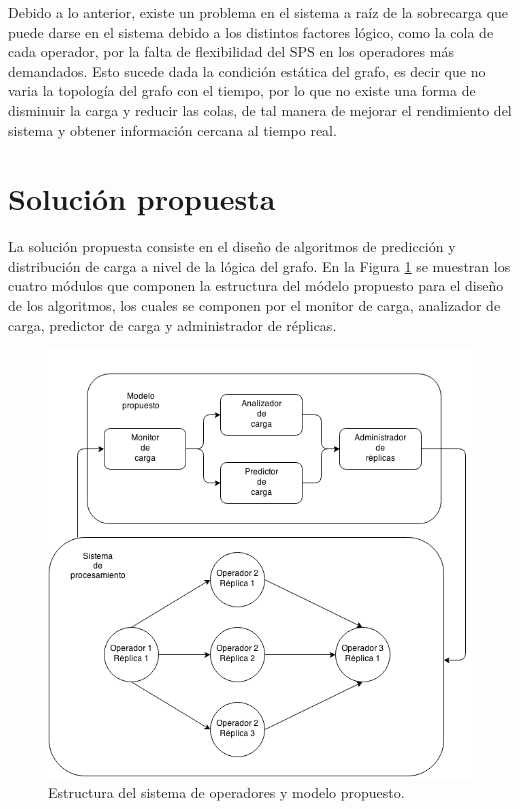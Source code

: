 Debido a lo anterior, existe un problema en el sistema a raíz de la sobrecarga que puede darse en el sistema debido a los distintos factores lógico, como la cola de cada operador, por la falta de flexibilidad del SPS en los operadores más demandados. Esto sucede dada la condición estática del grafo, es decir que no varia la topología del grafo con el tiempo, por lo que no existe una forma de disminuir la carga y reducir las colas, de tal manera de mejorar el rendimiento del sistema y obtener información cercana al tiempo real.

\section{Solución propuesta}
\label{intro:solucion}

La solución propuesta consiste en el dise\~no de algoritmos de predicci\'on y distribuci\'on de carga a nivel de la l\'ogica del grafo. En la Figura \ref{fig:opt} se muestran los cuatro módulos que componen la estructura del m\'odelo propuesto para el dise\~no de los algoritmos, los cuales se componen por el monitor de carga, analizador de carga, predictor de carga y administrador de réplicas.

\begin{figure}[ht!]
  \centering
    \includegraphics[scale=0.5]{images/Diagrama.png}
  \caption{Estructura del sistema de operadores y modelo propuesto.}
  \label{fig:opt}
\end{figure}

